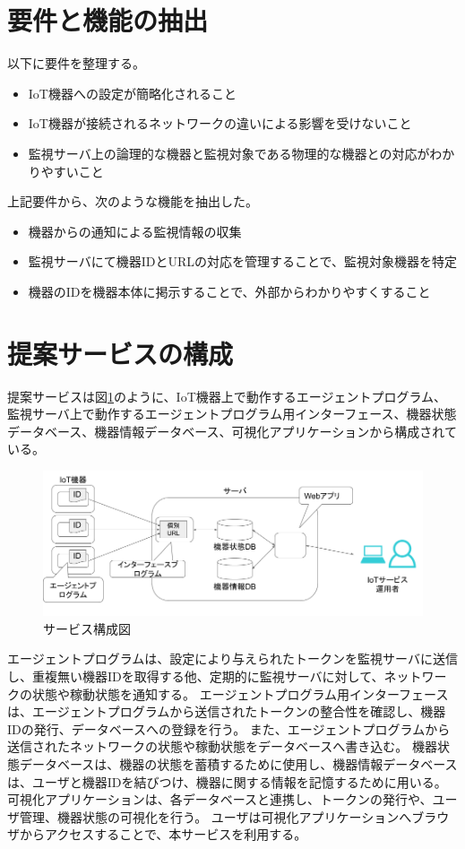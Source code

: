 \section{要件と機能の抽出}
以下に要件を整理する。
\begin{itemize}
\item IoT機器への設定が簡略化されること
\item IoT機器が接続されるネットワークの違いによる影響を受けないこと
\item 監視サーバ上の論理的な機器と監視対象である物理的な機器との対応がわかりやすいこと
\end{itemize}

上記要件から、次のような機能を抽出した。
\begin{itemize}
\item 機器からの通知による監視情報の収集
\item 監視サーバにて機器IDとURLの対応を管理することで、監視対象機器を特定
\item 機器のIDを機器本体に掲示することで、外部からわかりやすくすること
\end{itemize}


\section{提案サービスの構成}
提案サービスは図\ref{fig:blockdiagram}のように、IoT機器上で動作するエージェントプログラム、監視サーバ上で動作するエージェントプログラム用インターフェース、機器状態データベース、機器情報データベース、可視化アプリケーションから構成されている。
\begin{figure}[htbp]
\includegraphics[width=16cm]{images/prop_diag.png}
\caption{サービス構成図}
\label{fig:blockdiagram}
\end{figure}
エージェントプログラムは、設定により与えられたトークンを監視サーバに送信し、重複無い機器IDを取得する他、定期的に監視サーバに対して、ネットワークの状態や稼動状態を通知する。
エージェントプログラム用インターフェースは、エージェントプログラムから送信されたトークンの整合性を確認し、機器IDの発行、データベースへの登録を行う。
また、エージェントプログラムから送信されたネットワークの状態や稼動状態をデータベースへ書き込む。
機器状態データベースは、機器の状態を蓄積するために使用し、機器情報データベースは、ユーザと機器IDを結びつけ、機器に関する情報を記憶するために用いる。
可視化アプリケーションは、各データベースと連携し、トークンの発行や、ユーザ管理、機器状態の可視化を行う。
ユーザは可視化アプリケーションへブラウザからアクセスすることで、本サービスを利用する。

